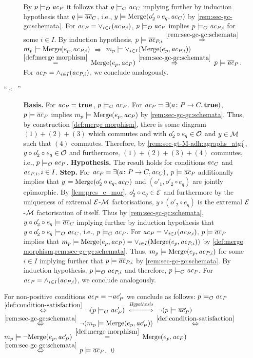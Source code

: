 \begin{description}
  By $p \models_{{\cal O}} \mathit{ac}_P$ it follows that $q \models_{{\cal O}} \mathit{ac}_C$ implying further by induction hypothesis that $q \models \overline{\mathit{ac}}_C$, i.e., $y \models \mathrm{Merge}(o'_2 \circ e_q,\mathit{ac}_C)$ by \cref{rem:sec-gc-gc:schemata}.
  For $\mathit{ac}_P=\vee_{i \in I}(\mathit{ac}_{P,i})$, $p \models_{{\cal O}} \mathit{ac}_P$ implies $p \models_{{\cal O}} \mathit{ac}_{P,i}$ for some $i \in I$.
  By induction hypothesis, $p \models \overline{\mathit{ac}}_{P,i}$ $\stackrel{\cref{rem:sec-gc-gc:schemata}}{\Rightarrow}$ $m_p \models \mathrm{Merge}(e_p,\mathit{ac}_{P,i})$ $\Rightarrow$ $m_p \models \vee_{i \in I}(\mathrm{Merge}(e_p,\mathit{ac}_{P,i}))$ $\stackrel{\cref{def:merge morphism}}{=}$ $\mathrm{Merge}(e_p,\mathit{ac}_P)$ $\stackrel{\cref{rem:sec-gc-gc:schemata}}{\Rightarrow}$ $p \models \overline{\mathit{ac}}_P$.
  For $\mathit{ac}_P=\wedge_{i \in I}(\mathit{ac}_{P,i})$, we conclude analogously.
  \item [``$\Leftarrow$''] \textbf{Basis.}
  For $\mathit{ac}_P=\textbf{true}$, $p \models_{{\cal O}} \mathit{ac}_P$.
  For $\mathit{ac}_P=\exists(a\colon P \to C,\textbf{true})$, $p \models \overline{\mathit{ac}}_P$ implies $m_p \models \mathrm{Merge}(e_p,\mathit{ac}_P)$ by \cref{rem:sec-gc-gc:schemata}.
  Thus, by construction \cref{def:merge morphism}, there is some diagram $(1)+(2)+(3)$ which commutes and with $o'_2 \circ e_q \in {\cal O}$ and $y \in {\cal M}$ such that $(4)$ commutes.
  Therefore, by \cref{rem:sec-gt-M-adh:agraphs_atgi}, $y \circ o'_2 \circ e_q \in {\cal O}$ and furthermore, $(1)+(2)+(3)+(4)$ commutes, i.e., $p \models_{{\cal O}} \mathit{ac}_P$.
  \textbf{Hypothesis.}
  The result holds for conditions $\mathit{ac}_C$ and $\mathit{ac}_{P,i},i \in I$.
  \textbf{Step.}
  For $\mathit{ac}_P=\exists(a\colon P \to C,\mathit{ac}_C)$, $p \models \overline{\mathit{ac}}_P$ additionally implies that $y \models \mathrm{Merge}(o'_2 \circ e_q,\mathit{ac}_C)$ and $(o'_1,o'_2 \circ e_q)$ are jointly epimorphic.
  By \cref{lem:pres_e_mor}, $o'_2 \circ e_q \in \mathcal{E}$ and furthermore by the uniqueness of extremal $\mathcal{E}$-${\cal M}$ factorisations, $y \circ (o'_2 \circ e_q)$ is the extremal $\mathcal{E}$-${\cal M}$ factorisation of itself.
  Thus by \cref{rem:sec-gc-gc:schemata}, $y \circ o'_2 \circ e_q \models \overline{\mathit{ac}}_C$ implying further by induction hypothesis that $y \circ o'_2 \circ e_q \models_{{\cal O}} \mathit{ac}_C$, i.e., $p \models_{{\cal O}} \mathit{ac}_P$.
  For $\mathit{ac}_P=\vee_{i \in I}(\mathit{ac}_{P,i})$, $p \models \overline{\mathit{ac}}_P$ implies that $m_p \models \mathrm{Merge}(e_p,\mathit{ac}_P)=\vee_{i \in I}(\mathrm{Merge}(e_p,\mathit{ac}_{P,i}))$ by \cref{def:merge morphism,rem:sec-gc-gc:schemata}.
  Thus, $m_p \models \mathrm{Merge}(e_p,\mathit{ac}_{P,i})$ for some $i \in I$ implying further that $p \models \overline{\mathit{ac}}_{P,i}$ by \cref{rem:sec-gc-gc:schemata}.
  By induction hypothesis, $p \models_{{\cal O}} \mathit{ac}_{P,i}$ and therefore, $p \models_{{\cal O}} \mathit{ac}_P$.
  For $\mathit{ac}_P=\wedge_{i \in I}(\mathit{ac}_{P,i})$, we conclude analogously.
\end{description}
For non-positive conditions $\mathit{ac}_P=\neg \mathit{ac}'_P$ we conclude as follows:
$p \models_{{\cal O}} \mathit{ac}_P$ $\stackrel{\cref{def:condition-satisfaction}}{\Leftrightarrow}$ $\neg(p \models_{{\cal O}} \mathit{ac}'_P)$ $\stackrel{Hypothesis}{\Leftrightarrow}$ $\neg(p \models \overline{\mathit{ac}}'_P)$ $\stackrel{\cref{rem:sec-gc-gc:schemata}}{\Leftrightarrow}$ $\neg(m_p \models \mathrm{Merge}(e_p,\mathit{ac}'_P))$ $\stackrel{\cref{def:condition-satisfaction}}{\Leftrightarrow}$ $m_p \models \neg\mathrm{Merge}(e_p,\mathit{ac}'_P)$ $\stackrel{\cref{def:merge morphism}}{=}$ $\mathrm{Merge}(e_p,\mathit{ac}_P)$ $\stackrel{\cref{rem:sec-gc-gc:schemata}}{\Leftrightarrow}$ $p \models \overline{\mathit{ac}}_P$.
\qed


